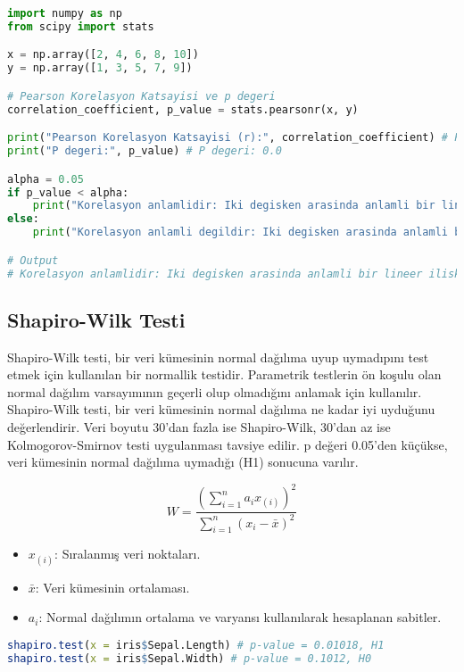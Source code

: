 \begin{lstlisting}[language=Python]
import numpy as np
from scipy import stats

x = np.array([2, 4, 6, 8, 10])
y = np.array([1, 3, 5, 7, 9])

# Pearson Korelasyon Katsayisi ve p degeri
correlation_coefficient, p_value = stats.pearsonr(x, y)

print("Pearson Korelasyon Katsayisi (r):", correlation_coefficient) # Pearson Korelasyon Katsayisi (r): 1.0
print("P degeri:", p_value) # P degeri: 0.0

alpha = 0.05
if p_value < alpha:
    print("Korelasyon anlamlidir: Iki degisken arasinda anlamli bir lineer iliski vardir.")
else:
    print("Korelasyon anlamli degildir: Iki degisken arasinda anlamli bir lineer iliski yoktur.")

# Output
# Korelasyon anlamlidir: Iki degisken arasinda anlamli bir lineer iliski vardir.
\end{lstlisting}

\subsection{Shapiro-Wilk Testi}
Shapiro-Wilk testi, bir veri kümesinin normal dağılıma uyup uymadıpını test etmek için kullanılan bir normallik testidir. Parametrik testlerin ön koşulu olan normal dağılım varsayımının geçerli olup olmadığını anlamak için kullanılır. Shapiro-Wilk testi, bir veri kümesinin normal dağılıma ne kadar iyi uyduğunu değerlendirir. Veri boyutu 30'dan fazla ise Shapiro-Wilk, 30'dan az ise Kolmogorov-Smirnov testi uygulanması tavsiye edilir. p değeri 0.05'den küçükse, veri kümesinin normal dağılıma uymadığı (H1) sonucuna varılır.

\[
W = \frac{\left( \sum_{i=1}^{n} a_i x_{(i)} \right)^2}{\sum_{i=1}^{n} (x_i - \bar{x})^2}
\]

\begin{itemize}
	\item $x_(i)$: Sıralanmış veri noktaları.
	\item $\bar{x}$: Veri kümesinin ortalaması.
	\item $a_i$: Normal dağılımın ortalama ve varyansı kullanılarak hesaplanan sabitler.
\end{itemize}

\begin{lstlisting}[language=R]
shapiro.test(x = iris$Sepal.Length) # p-value = 0.01018, H1
shapiro.test(x = iris$Sepal.Width) # p-value = 0.1012, H0
\end{lstlisting}

